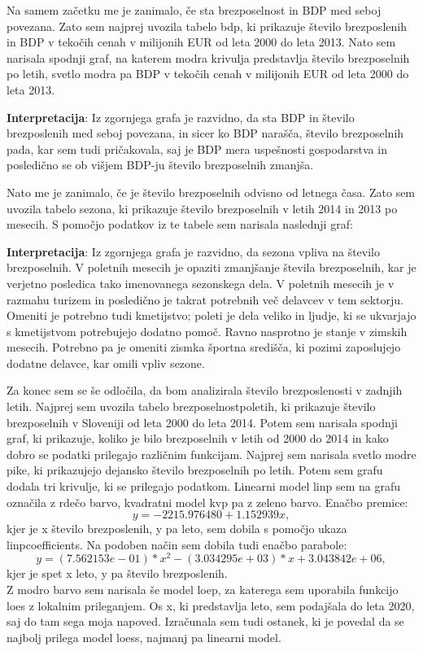 \documentclass[11pt,a4paper]{article}
\begin{document}
Na samem začetku me je zanimalo, če sta brezposelnost in BDP med seboj povezana. Zato sem najprej uvozila tabelo bdp, ki prikazuje število brezposlenih in BDP v tekočih cenah v milijonih EUR od leta 2000 do leta 2013. Nato sem narisala spodnji graf, na katerem modra krivulja predstavlja število brezposelnih po letih, svetlo modra pa BDP v tekočih cenah v milijonih EUR od leta 2000 do leta 2013.


\textbf{Interpretacija}: Iz zgornjega grafa je razvidno, da sta BDP in število brezposlenih med seboj povezana, in sicer ko BDP narašča, število brezposelnih pada, kar sem tudi pričakovala, saj je BDP mera uspešnosti gospodarstva in posledično se ob višjem BDP-ju število brezposelnih zmanjša.

\newpage
Nato me je zanimalo, če je število brezposelnih odvisno od letnega časa. Zato sem uvozila tabelo sezona, ki prikazuje število brezposelnih v letih 2014 in 2013 po mesecih. S pomočjo podatkov iz te tabele sem narisala naslednji graf:


\textbf{Interpretacija}: Iz zgornjega grafa je razvidno, da sezona vpliva na število brezposelnih. V poletnih mesecih je opaziti zmanjšanje števila brezposelnih, kar je verjetno posledica tako imenovanega sezonskega dela. V poletnih mesecih je v razmahu turizem in posledično je takrat potrebnih več delavcev v tem sektorju. Omeniti je potrebno tudi kmetijstvo; poleti je dela veliko in ljudje, ki se ukvarjajo s kmetijstvom potrebujejo dodatno pomoč. Ravno nasprotno je stanje v zimskih mesecih. Potrebno pa je omeniti zismka športna središča, ki pozimi zaposlujejo dodatne delavce, kar omili vpliv sezone.

\newpage
Za konec sem se še odločila, da bom analizirala število brezposlenosti v zadnjih letih. Najprej sem uvozila tabelo brezposelnostpoletih, ki prikazuje število brezposelnih v Sloveniji od leta 2000 do leta 2014. Potem sem narisala spodnji graf, ki prikazuje, koliko je bilo brezposelnih v letih od 2000 do 2014 in kako dobro se podatki prilegajo različnim funkcijam. Najprej sem narisala svetlo modre pike, ki prikazujejo dejansko število brezposelnih po letih. Potem sem grafu dodala tri krivulje, ki se prilegajo podatkom. Linearni model linp sem na grafu označila z rdečo barvo, kvadratni model kvp pa z zeleno barvo. Enačbo premice: $$ y = -2215.976480 + 1.152939x, $$ kjer je x število brezposlenih, y pa leto, sem dobila s pomočjo ukaza linpcoefficients. Na podoben način sem dobila tudi enačbo parabole: $$ y = (7.562153e-01) * x^2 - (3.034295e+03) * x + 3.043842e+06, $$ kjer je spet x leto, y pa število brezposlenih.\\
Z modro barvo sem narisala še model loep, za katerega sem uporabila funkcijo loes z lokalnim prileganjem. Os x, ki predstavlja leto, sem podajšala do leta 2020, saj do tam sega moja napoved. Izračunala sem tudi ostanek, ki je povedal da se najbolj prilega model loess, najmanj pa linearni model.
\end{document}
